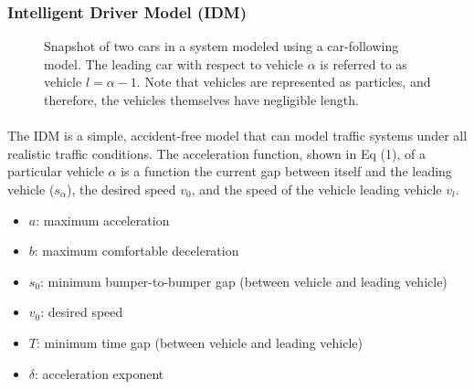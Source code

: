 \documentclass[12pt]{article}
\begin{document}
\subsubsection{Intelligent Driver Model (IDM)}
\begin{figure}
  \centering
  \caption{Snapshot of two cars in a system modeled using a car-following model.  The leading car with respect to vehicle $\alpha$  is referred to as vehicle $l=\alpha-1$.  Note that vehicles are represented as particles, and therefore, the vehicles themselves have negligible length.}
\end{figure}
\paragraph{}
The IDM is a simple, accident-free model that can model traffic systems under all realistic traffic conditions.  The acceleration function, shown in Eq (1), of a particular vehicle $\alpha$ is a function the current gap between itself and the leading vehicle ($s_\alpha$), the desired speed $v_0$, and the speed of the vehicle leading vehicle $v_l$.  

\begin{mymathbox}[title=IDM Parameters, colframe=blue!30!black]
  \begin{itemize}
    \item $a$: maximum acceleration
    \item $b$: maximum comfortable deceleration
    \item $s_0$: minimum bumper-to-bumper gap (between vehicle and leading vehicle)
    \item $v_0$: desired speed
    \item $T$: minimum time gap (between vehicle and leading vehicle)
    \item $\delta$: acceleration exponent
  \end{itemize}
\end{mymathbox}
\end{document}
